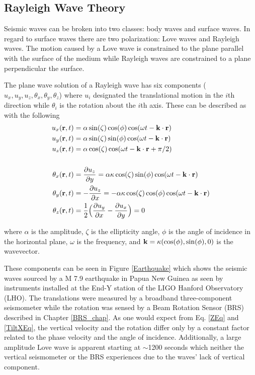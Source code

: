 \documentclass [12pt, proquest]{uwthesis}[2019]
\begin{document}
\subsection{Rayleigh Wave Theory}

Seismic waves can be broken into two classes: body waves and surface waves. In regard to surface waves there are two polarization: Love waves and Rayleigh waves. The motion caused by a Love wave is constrained to the plane parallel with the surface of the medium while Rayleigh waves are constrained to a plane perpendicular the surface. 

The plane wave solution of a Rayleigh wave has six components ($u_x, u_y, u_z, \theta_x, \theta_y, \theta_z$) where $u_i$ designated the translational motion in the $i$th direction while $\theta_i$ is the rotation about the $i$th axis.
These can be described as with the following~\cite{seismic}
\begin{align}
u_x({\bf r} ,t)&=\alpha \sin(\zeta) \cos(\phi) \cos(\omega t-{\bf k}\cdot{\bf r})\label{XEq}\\
u_y({\bf r} ,t)&=\alpha \sin(\zeta) \sin(\phi) \cos(\omega t-{\bf k}\cdot{\bf r})\\
u_z({\bf r} ,t)&=\alpha \cos(\zeta) \cos(\omega t-{\bf k}\cdot{\bf r}+\pi/2)\label{ZEq}\\
\notag \\
\theta_x({\bf r} ,t)&=\frac{\partial u_z}{\partial y}=\alpha \kappa \cos(\zeta) \sin(\phi) \cos(\omega t-{\bf k}\cdot{\bf r})\label{TiltXEq}\\
\theta_y({\bf r} ,t)&=-\frac{\partial u_z}{\partial x}=-\alpha \kappa \cos(\zeta) \cos(\phi) \cos(\omega t-{\bf k}\cdot{\bf r})\\
\theta_z({\bf r} ,t)&=\frac{1}{2}\Big(\frac{\partial u_y}{\partial x}-\frac{\partial u_x}{\partial y}\Big)=0
\end{align}

where $\alpha$ is the amplitude, $\zeta$ is the ellipticity angle, $\phi$ is the angle of incidence in the horizontal plane, $\omega$ is the frequency, and $\bf{k}=\kappa (\cos(\phi),\sin(\phi),\text{0})$ is the wavevector.

These components can be seen in Figure \ref{Earthquake} which shows the seismic waves sourced by a M 7.9 earthquake in Papua New Guinea as seen by instruments installed at the End-Y station of the LIGO Hanford Observatory (LHO). The translations were measured by a broadband three-component seismometer while the rotation was sensed by a Beam Rotation Sensor (BRS) described in Chapter \ref{BRS_chap}. As one would expect from Eq. \ref{ZEq} and \ref{TiltXEq}, the vertical velocity and the rotation differ only by a constant factor related to the phase velocity and the angle of incidence. Additionally, a large amplitude Love wave is apparent starting at $\sim$1200 seconds which neither the vertical seismometer or the BRS experiences due to the waves' lack of vertical component.
\end{document}

